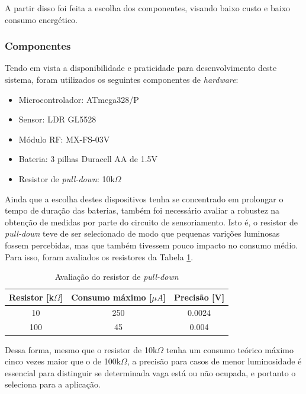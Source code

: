 \documentclass[oneside,openright,12pt]{ufsm_2015} %
\begin{document}
    A partir disso foi feita a escolha dos componentes, visando baixo custo e baixo consumo energético.
    
    \subsubsection{Componentes}
    Tendo em vista a disponibilidade e praticidade para desenvolvimento deste sistema, foram utilizados os seguintes componentes de \textit{hardware}:
    \begin{itemize}
        \item Microcontrolador: ATmega328/P
        \item Sensor: LDR GL5528 
        \item Módulo RF: MX-FS-03V
        \item Bateria: 3 pilhas Duracell AA de 1.5V
        \item Resistor de \textit{pull-down}: 10k$\Omega$
    \end{itemize}
    
    Ainda que a escolha destes dispositivos tenha se concentrado em prolongar o tempo de duração das baterias, também foi necessário avaliar a robustez na obtenção de medidas por parte do circuito de sensoriamento. Isto é, o resistor de \textit{pull-down} teve de ser selecionado de modo que pequenas varições luminosas fossem percebidas, mas que também tivessem pouco impacto no consumo médio. Para isso, foram avaliados os resistores da Tabela \ref{table:pull-down}.
    
    \begin{table}[ht]
         \centering
         \caption{Avaliação do resistor de \textit{pull-down}}
         \begin{tabular}{ c c c }
             \hline
             Resistor [k$\Omega$] & Consumo máximo [$\mu A$] & Precisão [V] \\
             \hline
             10 & 250 & 0.0024 \\
             100 & 45 & 0.004 \\
             \hline
         \end{tabular}
         \vspace{\baselineskip} %
          \label{table:pull-down}
    \end{table}
    
    Dessa forma, mesmo que o resistor de 10k$\Omega$ tenha um consumo teórico máximo cinco vezes maior que o de 100k$\Omega$, a precisão para casos de menor luminosidade é essencial para distinguir se determinada vaga está ou não ocupada, e portanto o seleciona para a aplicação.
    
\end{document}
